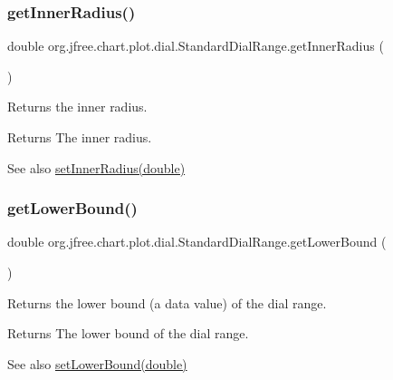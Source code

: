 \subsubsection{\texorpdfstring{get\+Inner\+Radius()}{getInnerRadius()}}
{\footnotesize\ttfamily double org.\+jfree.\+chart.\+plot.\+dial.\+Standard\+Dial\+Range.\+get\+Inner\+Radius (\begin{DoxyParamCaption}{ }\end{DoxyParamCaption})}

Returns the inner radius.

\begin{DoxyReturn}{Returns}
The inner radius.
\end{DoxyReturn}
\begin{DoxySeeAlso}{See also}
\mbox{\hyperlink{classorg_1_1jfree_1_1chart_1_1plot_1_1dial_1_1_standard_dial_range_a3c79913727054b5ac45caac06f77fdaf}{set\+Inner\+Radius(double)}} 
\end{DoxySeeAlso}
\mbox{\label{classorg_1_1jfree_1_1chart_1_1plot_1_1dial_1_1_standard_dial_range_a115710e99c844cfe17be058ab3fedc1d}} 
\subsubsection{\texorpdfstring{get\+Lower\+Bound()}{getLowerBound()}}
{\footnotesize\ttfamily double org.\+jfree.\+chart.\+plot.\+dial.\+Standard\+Dial\+Range.\+get\+Lower\+Bound (\begin{DoxyParamCaption}{ }\end{DoxyParamCaption})}

Returns the lower bound (a data value) of the dial range.

\begin{DoxyReturn}{Returns}
The lower bound of the dial range.
\end{DoxyReturn}
\begin{DoxySeeAlso}{See also}
\mbox{\hyperlink{classorg_1_1jfree_1_1chart_1_1plot_1_1dial_1_1_standard_dial_range_a0d68b1fc919869ee5330a5904dfca573}{set\+Lower\+Bound(double)}} 
\end{DoxySeeAlso}
\mbox{\label{classorg_1_1jfree_1_1chart_1_1plot_1_1dial_1_1_standard_dial_range_a46f44c8aa6eabe91b754ee9a852a6740}} 
